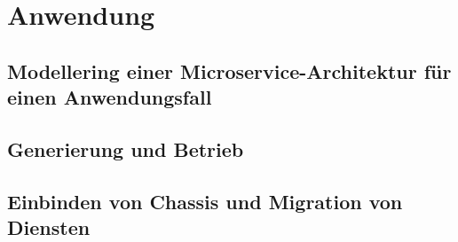 \chapter{Anwendung}

\section{Modellering einer Microservice-Architektur für einen Anwendungsfall}

\section{Generierung und Betrieb}

\section{Einbinden von Chassis und Migration von Diensten}